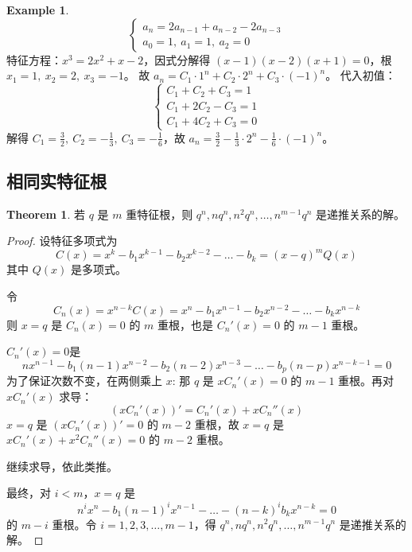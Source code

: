 \documentclass[oneside]{book}
\theoremstyle{definition}
\newtheorem{example}{Example}[section]
\newtheorem{theorem}{Theorem}[section]
\begin{document}
\begin{example}
	\[
	\begin{cases}
		a_n = 2a_{n-1} + a_{n-2} - 2a_{n-3} \\
		a_0 = 1, \ a_1 = 1, \ a_2 = 0
	\end{cases}
	\]
	特征方程：\( x^3 = 2x^2 + x - 2 \)，因式分解得 \( (x - 1)(x - 2)(x + 1) = 0 \)，根 \( x_1 = 1, \ x_2 = 2, \ x_3 = -1 \)。
	故 \( a_n = C_1 \cdot 1^n + C_2 \cdot 2^n + C_3 \cdot (-1)^n \)。
	代入初值：
	\[
	\begin{cases}
		C_1 + C_2 + C_3 = 1 \\
		C_1 + 2C_2 - C_3 = 1 \\
		C_1 + 4C_2 + C_3 = 0
	\end{cases}
	\]
	解得 \( C_1 = \frac{3}{2}, \ C_2 = -\frac{1}{3}, \ C_3 = -\frac{1}{6} \)，故 \( a_n = \frac{3}{2} - \frac{1}{3} \cdot 2^n - \frac{1}{6} \cdot (-1)^n \)。
\end{example}
\subsection{相同实特征根}
\begin{theorem}
	若 \( q \) 是 \( m \) 重特征根，则 \( q^n, nq^n, n^2q^n, \dots, n^{m-1}q^n \) 是递推关系的解。
\end{theorem}

\begin{proof}
	设特征多项式为
	\[
	C(x) = x^k - b_1x^{k-1} - b_2x^{k-2} - \dots - b_k = (x - q)^m Q(x)
	\]
	其中 \( Q(x) \) 是多项式。
	
	令
	\[
	C_n(x) = x^{n-k}C(x)=x^n - b_1x^{n-1} - b_2x^{n-2} - \dots - b_kx^{n-k}
	\]
	则 \( x = q \) 是 \( C_n(x) = 0 \) 的 \( m \) 重根，也是 \( C_n'(x) = 0 \) 的 \( m-1 \) 重根。
	
	\( C_n'(x) = 0 \)是
	\[
	n x^{n-1} - b_1(n-1)x^{n-2} - b_2(n-2)x^{n-3} - \dots - b_p(n-p)x^{n-k-1} = 0
	\]
	为了保证次数不变，在两侧乘上 \(x\):
	那 \(q\) 是 \( x C_n'(x) = 0 \) 的 \( m-1 \) 重根。再对 \( x C_n'(x) \) 求导：
	\[
	(x C_n'(x))' = C_n'(x) + x C_n''(x)
	\]
	\( x = q \) 是 \( (x C_n'(x))' = 0 \) 的 \( m-2 \) 重根，故 \( x = q \) 是 \( x C_n'(x) + x^2 C_n''(x) = 0 \) 的 \( m-2 \) 重根。
	
	继续求导，依此类推。
	
	最终，对 \( i < m \)，\( x = q \) 是
	\[
	n^i x^n - b_1(n-1)^i x^{n-1} - \dots - (n-k)^ib_k x^{n-k} = 0
	\]
	的 \( m-i\) 重根。令 \( i = 1, 2, 3, \dots, m-1 \)，得 \( q^n, nq^n, n^2q^n, \dots, n^{m-1}q^n \) 是递推关系的解。
\end{proof}
\end{document}
